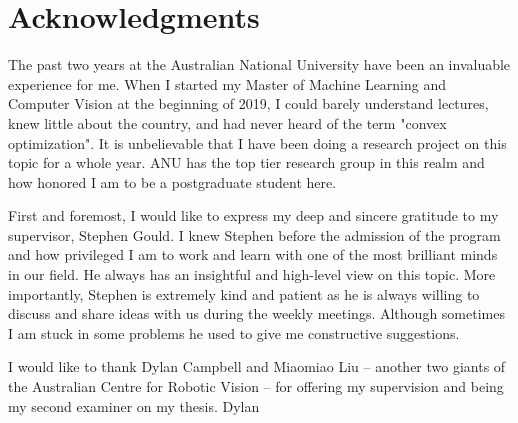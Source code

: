 \chapter*{Acknowledgments}
The past two years at the Australian National University have been an invaluable experience for me. When I started my Master of Machine Learning and Computer Vision at the beginning of 2019, I could barely understand lectures, knew little about the country, and had never heard of the term "convex optimization". It is unbelievable that I have been doing a research project on this topic for a whole year. ANU has the top tier research group in this realm and how honored I am to be a postgraduate student here. 
\par First and foremost, I would like to express my deep and sincere gratitude to my supervisor, Stephen Gould. I knew Stephen before the admission of the program and how privileged I am to work and learn with one of the most brilliant minds in our field. He always has an insightful and high-level view on this topic. More importantly, Stephen is extremely kind and patient as he is always willing to discuss and share ideas with us during the weekly meetings. Although sometimes I am stuck in some problems he used to give me constructive suggestions. 
\par I would like to thank Dylan Campbell and Miaomiao Liu -- another two giants of the Australian Centre for Robotic Vision -- for offering my supervision and being my second examiner on my thesis. Dylan 
